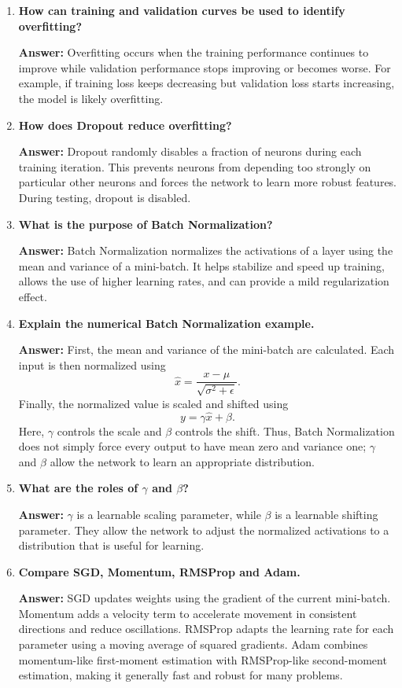 \documentclass[10pt]{article}
\begin{document}
\begin{enumerate}
\item \textbf{How can training and validation curves be used to identify overfitting?}

\textbf{Answer:} Overfitting occurs when the training performance continues to improve while validation performance stops improving or becomes worse. For example, if training loss keeps decreasing but validation loss starts increasing, the model is likely overfitting.

\item \textbf{How does Dropout reduce overfitting?}

\textbf{Answer:} Dropout randomly disables a fraction of neurons during each training iteration. This prevents neurons from depending too strongly on particular other neurons and forces the network to learn more robust features. During testing, dropout is disabled.

\item \textbf{What is the purpose of Batch Normalization?}

\textbf{Answer:} Batch Normalization normalizes the activations of a layer using the mean and variance of a mini-batch. It helps stabilize and speed up training, allows the use of higher learning rates, and can provide a mild regularization effect.

\item \textbf{Explain the numerical Batch Normalization example.}

\textbf{Answer:} First, the mean and variance of the mini-batch are calculated. Each input is then normalized using
\[
\hat{x} = \frac{x-\mu}{\sqrt{\sigma^2+\epsilon}}.
\]
Finally, the normalized value is scaled and shifted using
\[
y = \gamma\hat{x}+\beta.
\]
Here, $\gamma$ controls the scale and $\beta$ controls the shift. Thus, Batch Normalization does not simply force every output to have mean zero and variance one; $\gamma$ and $\beta$ allow the network to learn an appropriate distribution.

\item \textbf{What are the roles of $\gamma$ and $\beta$?}

\textbf{Answer:} $\gamma$ is a learnable scaling parameter, while $\beta$ is a learnable shifting parameter. They allow the network to adjust the normalized activations to a distribution that is useful for learning.

\item \textbf{Compare SGD, Momentum, RMSProp and Adam.}

\textbf{Answer:} SGD updates weights using the gradient of the current mini-batch. Momentum adds a velocity term to accelerate movement in consistent directions and reduce oscillations. RMSProp adapts the learning rate for each parameter using a moving average of squared gradients. Adam combines momentum-like first-moment estimation with RMSProp-like second-moment estimation, making it generally fast and robust for many problems.


\end{enumerate}
\end{document}
